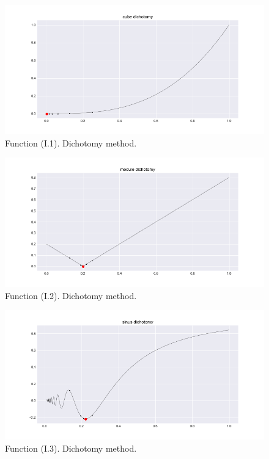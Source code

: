 \documentclass[a4paper,article,14pt]{extarticle}
\begin{document}
	\begin{figure}[h]
		\centering
		\includegraphics[scale=0.5]{cube_dichotomy.png}
		\caption{Function (I.1). Dichotomy method.}
		\label{cubeDich}
	\end{figure} 
	\begin{figure}[h]
		\centering
		\includegraphics[scale=0.5]{module_dichotomy.png}
		\caption{Function (I.2). Dichotomy method.}
		\label{moduleDich}
	\end{figure} 
	\begin{figure}[h]
	\centering
	\includegraphics[scale=0.5]{sinus_dichotomy.png}
	\caption{Function (I.3). Dichotomy method.}
	\label{sinDich}
	\end{figure}
\end{document}
